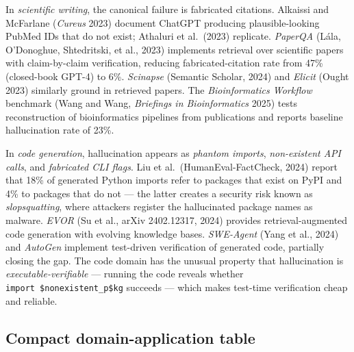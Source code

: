 In \emph{scientific writing}, the canonical failure is fabricated citations. Alkaissi and McFarlane (\emph{Cureus} 2023) document ChatGPT producing plausible-looking PubMed IDs that do not exist; Athaluri et al.~(2023) replicate. \emph{PaperQA} (Lála, O'Donoghue, Shtedritski, et al., 2023) implements retrieval over scientific papers with claim-by-claim verification, reducing fabricated-citation rate from 47\% (closed-book GPT-4) to 6\%. \emph{Scinapse} (Semantic Scholar, 2024) and \emph{Elicit} (Ought 2023) similarly ground in retrieved papers. The \emph{Bioinformatics Workflow} benchmark (Wang and Wang, \emph{Briefings in Bioinformatics} 2025) tests reconstruction of bioinformatics pipelines from publications and reports baseline hallucination rate of 23\%.

In \emph{code generation}, hallucination appears as \emph{phantom imports}, \emph{non-existent API calls}, and \emph{fabricated CLI flags}. Liu et al.~(HumanEval-FactCheck, 2024) report that 18\% of generated Python imports refer to packages that exist on PyPI and 4\% to packages that do not --- the latter creates a security risk known as \emph{slopsquatting}, where attackers register the hallucinated package names as malware. \emph{EVOR} (Su et al., arXiv 2402.12317, 2024) provides retrieval-augmented code generation with evolving knowledge bases. \emph{SWE-Agent} (Yang et al., 2024) and \emph{AutoGen} implement test-driven verification of generated code, partially closing the gap. The code domain has the unusual property that hallucination is \emph{executable-verifiable} --- running the code reveals whether \texttt{import\ \$nonexistent\_p\$kg} succeeds --- which makes test-time verification cheap and reliable.

\subsection{Compact domain-application table}\label{compact-domain-application-table}

